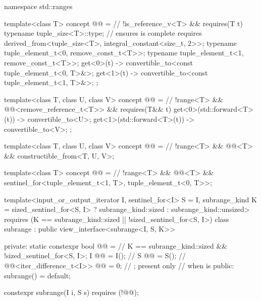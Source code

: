 %
\begin{codeblock}
namespace std::ranges {
  template<class T>
    concept @@ =                                     // \expos
      !is_reference_v<T> && requires(T t) {
        typename tuple_size<T>::type;                       // ensures  is complete
        requires derived_from<tuple_size<T>, integral_constant<size_t, 2>>;
        typename tuple_element_t<0, remove_const_t<T>>;
        typename tuple_element_t<1, remove_const_t<T>>;
        { get<0>(t) } -> convertible_to<const tuple_element_t<0, T>&>;
        { get<1>(t) } -> convertible_to<const tuple_element_t<1, T>&>;
      };

  template<class T, class U, class V>
    concept @@ =                      // \expos
      !range<T> && @@<remove_reference_t<T>> &&
      requires(T&& t) {
        { get<0>(std::forward<T>(t)) } -> convertible_to<U>;
        { get<1>(std::forward<T>(t)) } -> convertible_to<V>;
      };

  template<class T, class U, class V>
    concept @@ =                    // \expos
      !range<T> && @@<T> && constructible_from<T, U, V>;

  template<class T>
    concept @@ =                        // \expos
      !range<T> && @@<T> &&
      sentinel_for<tuple_element_t<1, T>, tuple_element_t<0, T>>;

  template<input_or_output_iterator I, sentinel_for<I> S = I, subrange_kind K =
      sized_sentinel_for<S, I> ? subrange_kind::sized : subrange_kind::unsized>
    requires (K == subrange_kind::sized || !sized_sentinel_for<S, I>)
  class subrange : public view_interface<subrange<I, S, K>> {
  private:
    static constexpr bool @@ =                           // \expos
      K == subrange_kind::sized && !sized_sentinel_for<S, I>;
    I @@ = I();                                             // \expos
    S @@ = S();                                               // \expos
    @@<iter_difference_t<I>> @@ = 0;       // \expos; present only
                                                                // when  is 
  public:
    subrange() = default;

    constexpr subrange(I i, S s) requires (!@@);

}}
\end{codeblock}
